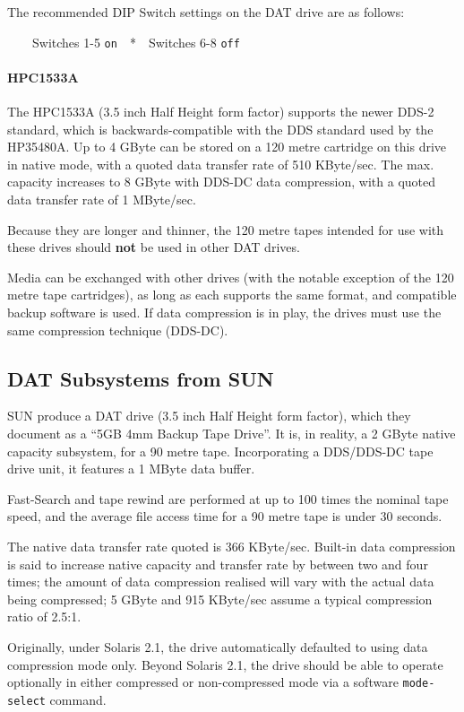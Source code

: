 \documentclass[11pt]{article}
\begin{document}
The recommended DIP Switch settings on the DAT drive are as follows:

\ \ \ \ Switches 1-5 {\tt on}\ \ *\ \ Switches 6-8 {\tt off}

\paragraph {HPC1533A}

The HPC1533A (3.5 inch Half Height form factor) supports the newer DDS-2
standard, which is backwards-compatible with the DDS standard used by the
HP35480A. Up to 4 GByte can be stored on a 120 metre cartridge on this drive
in native mode, with a quoted data transfer rate of 510 KByte/sec. The max.
capacity increases to 8 GByte with DDS-DC data compression, with a quoted data
transfer rate of 1 MByte/sec.

Because they are longer and thinner, the 120 metre tapes intended for use
with these drives should {\bf not} be used in other DAT drives.

Media can be exchanged with other drives (with the notable exception of the
120 metre tape cartridges), as long as each supports the same format, and
compatible backup software is used. If data compression is in play, the
drives must use the same compression technique (DDS-DC).

\subsection {DAT Subsystems from SUN}

SUN produce a DAT drive (3.5 inch Half Height form factor), which they
document as a ``5GB 4mm Backup Tape Drive''. It is, in reality, a 2 GByte
native capacity subsystem, for a 90 metre tape. Incorporating a DDS/DDS-DC
tape drive unit, it features a 1 MByte data buffer.

Fast-Search and tape rewind are performed at up to 100 times the nominal
tape speed, and the average file access time for a 90 metre tape is under
30 seconds.

The native data transfer rate quoted is 366 KByte/sec.  Built-in data
compression is said to increase native capacity and transfer rate by between
two and four times; the amount of data compression realised will vary with
the actual data being compressed; 5 GByte and 915 KByte/sec assume a typical
compression ratio of 2.5:1.

Originally, under Solaris 2.1, the drive automatically defaulted to using
data compression mode only. Beyond Solaris 2.1, the drive should be able to
operate optionally in either compressed or non-compressed mode via a
software {\tt mode-select} command.
\end{document}
